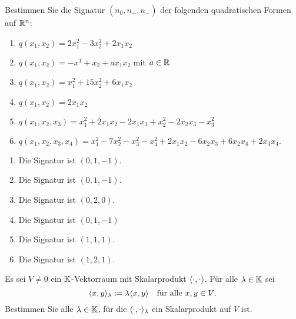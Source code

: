 \documentclass[a4paper,10pt]{scrartcl}
\begin{document}
\begin{question}
  Bestimmen Sie die Signatur $(n_0, n_+, n_-)$ der folgenden quadratischen Formen auf $\mathbb{R}^n$:
  \begin{enumerate}[leftmargin=*]
    \item
      $
          q(x_1, x_2)
        = 2 x_1^2 - 3 x_2^2 + 2 x_1 x_2
      $
    \item
      $
          q(x_1, x_2)
        = - x^1 + x_2 + a x_1 x_2
      $
      mit $a \in \mathbb{R}$
    \item
      $
          q(x_1, x_2)
        = x_1^2 + 15 x_2^2 + 6 x_1 x_2
      $
    \item
      $
          q(x_1, x_2)
        = 2 x_1 x_2
      $
    \item
      $
          q(x_1, x_2, x_3)
        = x_1^2 + 2 x_1 x_2 - 2 x_1 x_3 + x_2^2 - 2 x_2 x_3 - x_3^2
      $
    \item
      $
          q(x_1, x_2, x_3, x_4)
        = x_1^2 - 7 x_2^2 - x_3^2 - x_4^2 + 2 x_1 x_2 - 6 x_2 x_3 + 6 x_2 x_4 + 2 x_3 x_4.
      $
  \end{enumerate}
\end{question}
\begin{solution}
  \begin{enumerate}[leftmargin=*]
    \item
      Die Signatur ist $(0,1,-1)$.
    \item
      Die Signatur ist $(0,1,-1)$.
    \item
      Die Signatur ist $(0,2,0)$.
    \item
      Die Signatur ist $(0,1,-1)$
    \item
      Die Signatur ist $(1,1,1)$.
    \item
      Die Signatur ist $(1,2,1)$.
  \end{enumerate}
\end{solution}


\begin{question}
  Es sei $V \neq 0$ ein $\mathbb{K}$-Vektorraum mit Skalarprodukt $\langle \cdot, \cdot \rangle$.
  Für alle $\lambda \in \mathbb{K}$ sei
  \[
    \langle x, y \rangle_\lambda \coloneqq \lambda \langle x, y \rangle
    \quad
    \text{für alle $x, y \in V$}.
  \]
  Bestimmen Sie alle $\lambda \in \mathbb{K}$, für die $\langle \cdot, \cdot \rangle_\lambda$ ein Skalarprodukt auf $V$ ist.
\end{question}
\end{document}

